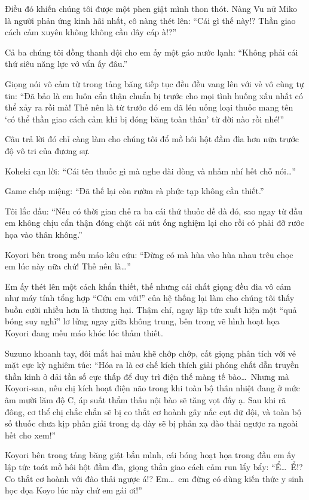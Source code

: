 \documentclass[../main.tex]{subfiles}
\begin{document}
Điều đó khiến chúng tôi được một phen giật mình thon thót. Nàng Vu nữ Miko là người phản ứng kinh hãi nhất, cô nàng thét lên: ``Cái gì thế này!? Thần giao cách cảm xuyên không không cần dây cáp à!?''

Cả ba chúng tôi đồng thanh dội cho em ấy một gáo nước lạnh: ``Không phải cái thứ siêu năng lực vớ vẩn ấy đâu.''

Giọng nói vô cảm từ trong tảng băng tiếp tục đều đều vang lên với vẻ vô cùng tự tin: ``Đã bảo là em luôn cẩn thận chuẩn bị trước cho mọi tình huống xấu nhất có thể xảy ra rồi mà! Thế nên là từ trước đó em đã lén uống loại thuốc mang tên `có thể thần giao cách cảm khi bị đóng băng toàn thân' từ đời nào rồi nhé!''

Câu trả lời đó chỉ càng làm cho chúng tôi đổ mồ hôi hột đầm đìa hơn nữa trước độ vô tri của đương sự.

Koheki cạn lời: ``Cái tên thuốc gì mà nghe dài dòng và nhảm nhí hết chỗ nói\dots''

Game chép miệng: ``Đã thế lại còn rườm rà phức tạp không cần thiết.''

Tôi lắc đầu: ``Nếu có thời gian chế ra ba cái thứ thuốc dề dà đó, sao ngay từ đầu em không chịu cẩn thận đóng chặt cái nút ống nghiệm lại cho rồi có phải đỡ rước họa vào thân không.''

Koyori bên trong mếu máo kêu cứu: ``Đừng có mà hùa vào hùa nhau trêu chọc em lúc này nữa chứ! Thế nên là\dots''

Em ấy thét lên một cách khẩn thiết, thế nhưng cái chất giọng đều đìa vô cảm như máy tính tổng hợp ``Cứu em với!'' của hệ thống lại làm cho chúng tôi thấy buồn cười nhiều hơn là thương hại. Thậm chí, ngay lập tức xuất hiện một ``quả bóng suy nghĩ'' lơ lửng ngay giữa không trung, bên trong vẽ hình hoạt họa Koyori đang mếu máo khóc lóc thảm thiết.


Suzuno khoanh tay, đôi mắt hai màu khẽ chớp chớp, cất giọng phân tích với vẻ mặt cực kỳ nghiêm túc: ``Hóa ra là cơ chế kích thích giải phóng chất dẫn truyền thần kinh ở dải tần số cực thấp để duy trì điện thế màng tế bào\dots\ Nhưng mà Koyori-san, nếu chị kích hoạt điện não trong khi toàn bộ thân nhiệt đang ở mức âm mười lăm độ C, áp suất thẩm thấu nội bào sẽ tăng vọt đấy ạ. Sau khi rã đông, cơ thể chị chắc chắn sẽ bị co thắt cơ hoành gây nấc cụt dữ dội, và toàn bộ số thuốc chưa kịp phân giải trong dạ dày sẽ bị phản xạ đào thải ngược ra ngoài hết cho xem!''

Koyori bên trong tảng băng giật bắn mình, cái bóng hoạt họa trong đầu em ấy lập tức toát mồ hôi hột đầm đìa, giọng thần giao cách cảm run lẩy bẩy: ``Ể\dots\ Ể!? Co thắt cơ hoành với đào thải ngược á!? Em\dots\ em đừng có dùng kiến thức y sinh học dọa Koyo lúc này chứ em gái ơi!''
\end{document}
